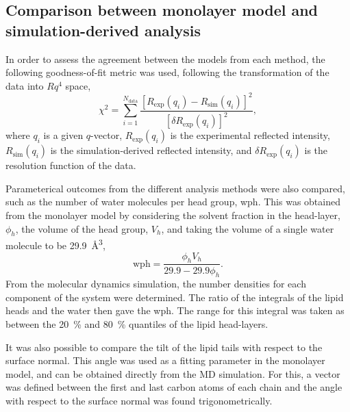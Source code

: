 \documentclass[amsmath,amssymb,twocolumn,superscriptaddress,aps,prl]{revtex4-1}
\begin{document}
\subsection{Comparison between monolayer model and simulation-derived analysis}
\label{sec:para}
In order to assess the agreement between the models from each method, the following goodness-of-fit metric was used, following the transformation of the data into $Rq^4$ space,
%
\begin{equation}
  \chi^2 = \sum_{i=1}^{N_{\text{data}}} \frac{[R_{\text{exp}}(q_i) - R_{\text{sim}}(q_i)]^2}{[\delta R_{\text{exp}}(q_i)]^2},
\end{equation}
%
where $q_i$ is a given $q$-vector, $R_{\text{exp}}(q_i)$ is the experimental reflected intensity, $R_{\text{sim}}(q_i)$ is the simulation-derived reflected intensity, and $\delta R_{\text{exp}}(q_i)$ is the resolution function of the data.

Parameterical outcomes from the different analysis methods were also compared, such as the number of water molecules per head group, wph.
This was obtained from the monolayer model by considering the solvent fraction in the head-layer, $\phi_h$, the volume of the head group, $V_h$, and taking the volume of a single water molecule to be \SI{29.9}{\cubic\angstrom},
%
\begin{equation}
  \text{wph} = \frac{\phi_hV_h}{29.9 - 29.9\phi_h}.
  \label{equ:wph}
\end{equation}
%
From the molecular dynamics simulation, the number densities for each component of the system were determined.
The ratio of the integrals of the lipid heads and the water then gave the wph.
The range for this integral was taken as between the \SI{20}{\percent} and \SI{80}{\percent} quantiles of the lipid head-layers.

It was also possible to compare the tilt of the lipid tails with respect to the surface normal.
This angle was used as a fitting parameter in the monolayer model, and can be obtained directly from the MD simulation.
For this, a vector was defined between the first and last carbon atoms of each chain and the angle with respect to the surface normal was found trigonometrically.
\end{document}
